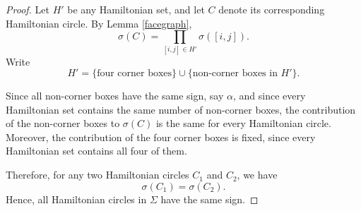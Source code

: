 \documentclass[10pt,a4paper]{amsart}
\begin{document}
\begin{proof}
Let $H'$ be any Hamiltonian set, and let $C$ denote its corresponding Hamiltonian circle.
By Lemma \ref{facegraph},
\[
\sigma(C)=\prod_{[i,j]\in H'} \sigma([i,j]).
\]
Write
\[
H' = \{\text{four corner boxes}\} \cup \{\text{non-corner boxes in } H'\}.
\]

Since all non-corner boxes have the same sign, say $\alpha$, and since every Hamiltonian set
contains the same number of non-corner boxes, the contribution of the non-corner boxes to
$\sigma(C)$ is the same for every Hamiltonian circle.
Moreover, the contribution of the four corner boxes is fixed, since every Hamiltonian set
contains all four of them.

Therefore, for any two Hamiltonian circles $C_1$ and $C_2$, we have
\[
\sigma(C_1)=\sigma(C_2).
\]
Hence, all Hamiltonian circles in $\Sigma$ have the same sign.




\end{proof}
\end{document}
